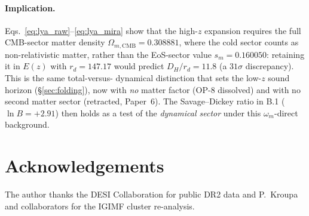 \documentclass[12pt,a4paper]{article}
\begin{document}
\paragraph{Implication.}
Eqs.~\eqref{eq:lya_raw}--\eqref{eq:lya_mira} show that the high-$z$ expansion
requires the full CMB-sector matter density $\Omega_{m,\mathrm{CMB}}=0.308881$,
where the cold sector counts as non-relativistic matter, rather than the
EoS-sector value $s_m=0.160050$: retaining it in $E(z)$ with $r_d=147.17$ would predict
$D_H/r_d=11.8$ (a $31\sigma$ discrepancy).  This is the same total-versus-
dynamical distinction that sets the low-$z$ sound horizon
(\S\ref{sec:folding}), now with \emph{no} matter factor (OP-8 dissolved) and
with no second matter sector (retracted, Paper~6).  The Savage--Dickey ratio in B.1
($\ln B=+2.91$) then holds as a test of the \emph{dynamical sector} under this
$\omega_m$-direct background.

\section*{Acknowledgements}
The author thanks the DESI Collaboration for public DR2 data and
P.~Kroupa and collaborators for the IGIMF cluster re-analysis.
\end{document}
